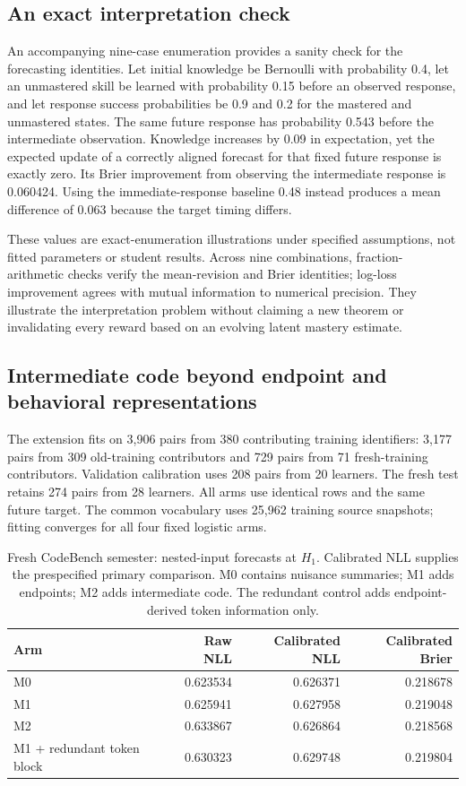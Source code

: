 \documentclass[11pt]{article}
\newcommand{\1}{\mathbb{I}}
\begin{document}
\subsection{An exact interpretation check}
An accompanying nine-case enumeration provides a sanity check for the forecasting identities. Let initial knowledge be Bernoulli with probability 0.4, let an unmastered skill be learned with probability 0.15 before an observed response, and let response success probabilities be 0.9 and 0.2 for the mastered and unmastered states. The same future response has probability 0.543 before the intermediate observation. Knowledge increases by 0.09 in expectation, yet the expected update of a correctly aligned forecast for that fixed future response is exactly zero. Its Brier improvement from observing the intermediate response is 0.060424. Using the immediate-response baseline 0.48 instead produces a mean difference of 0.063 because the target timing differs.

These values are exact-enumeration illustrations under specified assumptions, not fitted parameters or student results. Across nine combinations, fraction-arithmetic checks verify the mean-revision and Brier identities; log-loss improvement agrees with mutual information to numerical precision. They illustrate the interpretation problem without claiming a new theorem or invalidating every reward based on an evolving latent mastery estimate.

\subsection{Intermediate code beyond endpoint and behavioral representations}
The extension fits on 3,906 pairs from 380 contributing training identifiers: 3,177 pairs from 309 old-training contributors and 729 pairs from 71 fresh-training contributors. Validation calibration uses 208 pairs from 20 learners. The fresh test retains 274 pairs from 28 learners. All arms use identical rows and the same future target. The common vocabulary uses 25,962 training source snapshots; fitting converges for all four fixed logistic arms.

\begin{table}[htbp]
\centering
\caption{Fresh CodeBench semester: nested-input forecasts at $H_1$. Calibrated NLL supplies the prespecified primary comparison. M0 contains nuisance summaries; M1 adds endpoints; M2 adds intermediate code. The redundant control adds endpoint-derived token information only.}
\label{tab:revision}
\begin{tabular}{lrrr}
\toprule
Arm & Raw NLL & Calibrated NLL & Calibrated Brier \\
\midrule
M0 & 0.623534 & 0.626371 & 0.218678 \\
M1 & 0.625941 & 0.627958 & 0.219048 \\
M2 & 0.633867 & 0.626864 & 0.218568 \\
M1 + redundant token block & 0.630323 & 0.629748 & 0.219804 \\
\bottomrule
\end{tabular}
\end{table}
\end{document}
